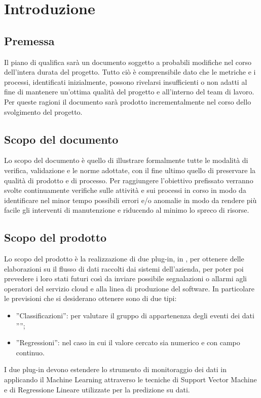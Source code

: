 \documentclass{article}
\begin{document}


\section{Introduzione}%
\label{sec:introduzione}

\subsection{Premessa}%
\label{sub:premessa}
Il piano di qualifica sarà un documento soggetto a probabili modifiche nel corso dell'intera durata del progetto.
Tutto ciò è comprensibile dato che le metriche e i processi, identificati inizialmente, possono rivelarsi insufficienti o non adatti al fine di mantenere un'ottima qualità del progetto e all'interno del team di lavoro.
Per queste ragioni il documento sarà prodotto incrementalmente nel corso dello svolgimento del progetto.

\subsection{Scopo del documento}%
\label{sub:scopo_del_documento}
Lo scopo del documento è quello di illustrare formalmente tutte le modalità di verifica, validazione e le norme adottate, con il fine ultimo quello di preservare la qualità di prodotto e di processo.
Per raggiungere l'obiettivo prefissato verranno svolte continuamente verifiche sulle attività e sui processi in corso in modo da identificare nel minor tempo possibili errori e/o anomalie in modo da rendere più facile gli interventi di manutenzione e riducendo al minimo lo spreco di risorse.

\subsection{Scopo del prodotto}%
\label{sub:scopo_del_prodotto}
Lo scopo del prodotto è la realizzazione di due plug-in, in , per ottenere delle elaborazioni su il flusso di dati raccolti dai sistemi dell’azienda,
per poter poi prevedere i loro stati futuri così da inviare possibile segnalazioni o allarmi agli operatori del servizio cloud e alla linea di produzione del software.
In particolare le previsioni che si desiderano ottenere sono di due tipi:
\begin{itemize}
    \item ”Classificazioni”: per valutare il gruppo di appartenenza degli eventi dei dati ””;
    \item ”Regressioni”: nel caso in cui il valore cercato sia numerico e con campo continuo. 
\end{itemize}
I due plug-in devono estendere lo strumento di monitoraggio dei dati in  applicando il Machine Learning attraverso le tecniche di 
Support Vector Machine e di Regressione Lineare utilizzate per la predizione su dati.
\end{document}
